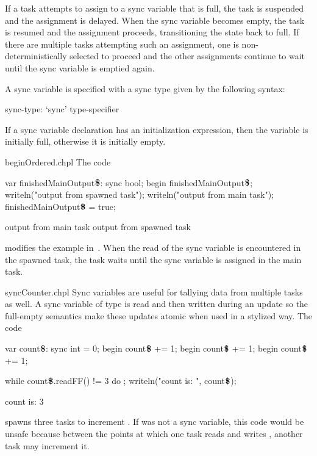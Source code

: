 If a task attempts to assign to a sync variable that is full, the task
is suspended and the assignment is delayed.  When the sync variable
becomes empty, the task is resumed and the assignment proceeds,
transitioning the state back to full.  If there are multiple tasks
attempting such an assignment, one is non-deterministically selected
to proceed and the other assignments continue to wait until the sync
variable is emptied again.

A sync variable is specified with a sync type given by the following
syntax:
\begin{syntax}
sync-type:
  `sync' type-specifier
\end{syntax}

If a sync variable declaration has an initialization expression, then
the variable is initially full, otherwise it is initially empty.

\begin{chapelexample}{beginOrdered.chpl}
The code
\begin{chapel}
var finishedMainOutput$\mbox{{\bf \$}}$: sync bool;
begin {
  finishedMainOutput$\mbox{{\bf \$}}$;
  writeln("output from spawned task");
}
writeln("output from main task");
finishedMainOutput$\mbox{{\bf \$}}$ = true;
\end{chapel}
\begin{chapelprintoutput}
output from main task
output from spawned task
\end{chapelprintoutput}
modifies the example in~.  When the read of the sync
variable is encountered in the spawned task, the task waits until the
sync variable is assigned in the main task.
\end{chapelexample}

\begin{chapelexample}{syncCounter.chpl}
Sync variables are useful for tallying data from multiple tasks as
well.  A sync variable of type  is read and then written
during an update so the full-empty semantics make these updates atomic
when used in a stylized way.  The code
\begin{chapel}
var count$\mbox{{\bf \$}}$: sync int = 0;
begin count$\mbox{{\bf \$}}$ += 1;
begin count$\mbox{{\bf \$}}$ += 1;
begin count$\mbox{{\bf \$}}$ += 1;
\end{chapel}
\begin{chapelpost}
while count$\mbox{{\bf \$}}$.readFF() != 3 do ;
writeln("count is: ", count$\mbox{{\bf \$}}$);
\end{chapelpost}
\begin{chapelprintoutput}
count is: 3
\end{chapelprintoutput}
spawns three tasks to increment .
If  was not a sync variable, this code
would be unsafe because between the points at which one task
reads  and
writes , another task may increment it.
\end{chapelexample}

